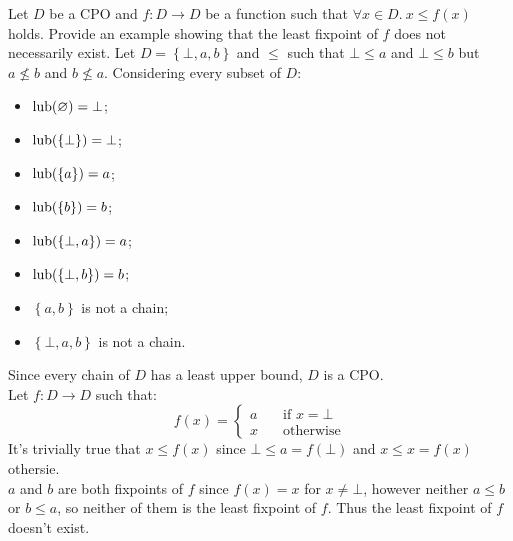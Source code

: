 \begin{exercise}{
    Let $D$ be a CPO and $f: D \to D$ be a function such that $\forall x \in D.\ x \leq f(x)$ holds. Provide an example showing that the least fixpoint of $f$ does not necessarily exist.
}
    Let $D = \left\{\bot, a, b\right\}$ and $\leq$ such that $\bot \le a$ and $\bot \le b$ but $a \not\leq b$ and $b \not\leq a$. Considering every subset of $D$:
    \begin{itemize}
        \item $\operatorname{lub}(\varnothing) = \bot$;
        \item $\operatorname{lub}(\left\{\bot\right\}) = \bot$;
        \item $\operatorname{lub}(\left\{a\right\}) = a$;
        \item $\operatorname{lub}(\left\{b\right\}) = b$;
        \item $\operatorname{lub}(\left\{\bot, a\right\}) = a$;
        \item $\operatorname{lub}(\left\{\bot, b\right\}) = b$;
        \item $\left\{a, b\right\}$ is not a chain;
        \item $\left\{\bot, a, b\right\}$ is not a chain.
    \end{itemize}
    Since every chain of $D$ has a least upper bound, $D$ is a CPO. \\
    Let $f : D \to D$ such that:
    \[
        f(x) = \begin{cases}
            a &\quad \text{if } x = \bot \\
            x &\quad \text{otherwise}
        \end{cases}
    \]
    It's trivially true that $x \leq f(x)$ since $\bot \leq a = f(\bot)$ and $x \leq x = f(x)$ othersie. \\
    $a$ and $b$ are both fixpoints of $f$ since $f(x) = x$ for $x \neq \bot$, however neither $a \leq b$ or $b \leq a$, so neither of them is the least fixpoint of $f$. Thus the least fixpoint of $f$ doesn't exist.
\end{exercise}
